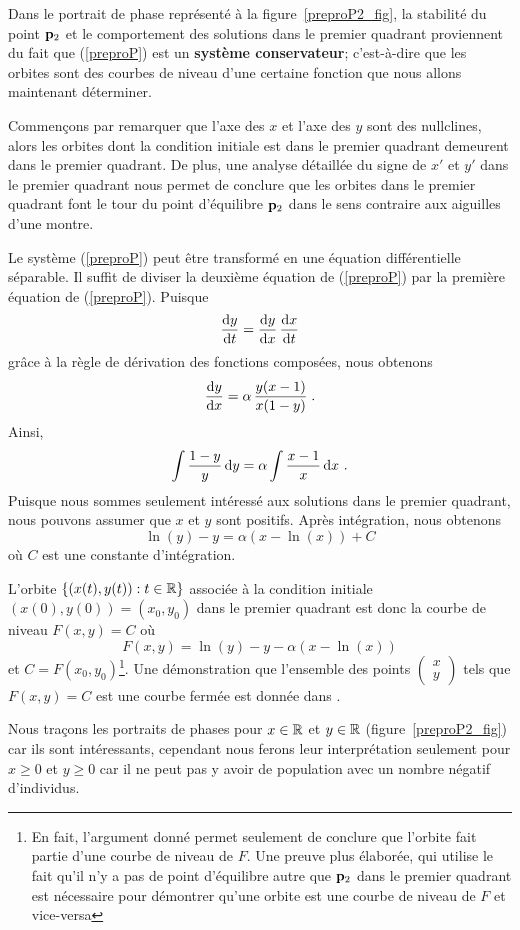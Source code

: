 {Dans le portrait de phase représenté à la figure~\ref{preproP2_fig}, la
stabilité du point $\mathbf{p}_2$ et le comportement des solutions dans
le premier quadrant proviennent du fait que (\ref{preproP}) est un
{\bfseries système conservateur};
c'est-à-dire que les orbites sont des courbes de niveau d'une certaine
fonction que nous allons maintenant déterminer.

Commençons par remarquer que l'axe des $x$ et l'axe des $y$ sont des
nullclines, alors les orbites dont la condition initiale est dans le premier
quadrant demeurent dans le premier quadrant.  De plus, une analyse détaillée
du signe de $x'$ et $y'$ dans le premier quadrant nous permet de conclure que
les orbites dans le premier quadrant font le tour du point d'équilibre
$\mathbf{p}_2$ dans le sens contraire aux aiguilles d'une montre.

Le système (\ref{preproP}) peut être transformé en une équation
différentielle séparable.  Il suffit de diviser la deuxième équation de 
(\ref{preproP}) par la première équation de (\ref{preproP}).  Puisque
\[
\frac{\mathrm{d}y}{\mathrm{d}t} = \frac{\mathrm{d}y}{\mathrm{d}x}\,\frac{\mathrm{d}x}{\mathrm{d}t}
\]
grâce à la règle de dérivation des fonctions composées, nous obtenons
\[
\frac{\mathrm{d}y}{\mathrm{d}x} = \alpha \, \frac{y(x-1)}{x(1-y)} \; .
\]
Ainsi,
\[
\int \frac{1-y}{y} \,\mathrm{d}y = \alpha \int \frac{x-1}{x} \,\mathrm{d}x \ .
\]
Puisque nous sommes seulement intéressé aux solutions dans le premier
quadrant, nous pouvons assumer que $x$ et $y$ sont positifs.  Après
intégration, nous obtenons
\[
\ln(y) - y = \alpha( x - \ln(x) ) + C
\]
où $C$ est une constante d'intégration.  

L'orbite
$\{ (x(t),y(t)) : t \in \mathbb{R} \}$ associée à la condition initiale
$(x(0),y(0)) = (x_0,y_0)$ dans le premier quadrant est donc la courbe de niveau
$F(x,y)=C$ où
\[
F(x,y) = \ln(y) - y - \alpha(x - \ln(x))
\]
et $C = F(x_0,y_0)$\footnote{En fait, l'argument donné permet seulement de
conclure que l'orbite fait partie d'une courbe de niveau de $F$.  Une preuve
plus élaborée, qui utilise le fait qu'il n'y a pas de point
d'équilibre autre que $\mathbf{p}_2$ dans le premier quadrant est
nécessaire pour démontrer qu'une orbite est une courbe de niveau de $F$ et
vice-versa}.  Une démonstration que l'ensemble des points
$\begin{pmatrix} x \\ y \end{pmatrix}$ tels
que $F(x,y)=C$ est une courbe fermée est donnée dans \cite{BR}.

Nous traçons les portraits de phases pour $x \in \mathbb{R}$ et $y\in \mathbb{R}$
(figure~\ref{preproP2_fig}) car ils sont intéressants, cependant nous
ferons leur interprétation seulement pour $x \geq 0$ et $y \geq 0$ car
il ne peut pas y avoir de population avec un nombre négatif
d'individus.

}
